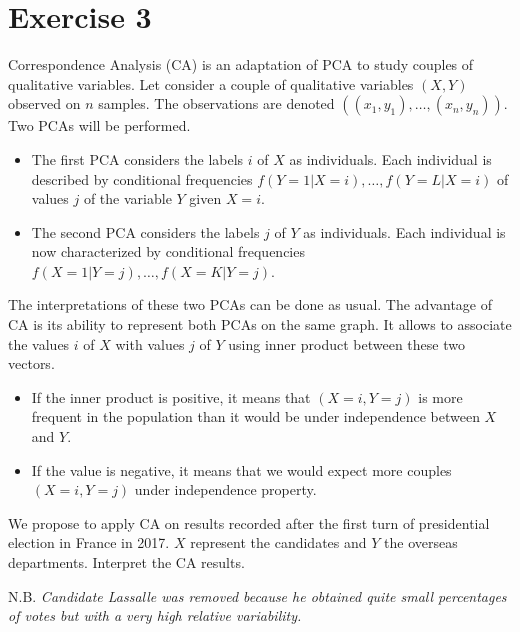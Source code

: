 \documentclass[
  11pt,
  a4paper,
]{article}
\begin{document}
\hypertarget{exercise-3}{%
\section{Exercise 3}\label{exercise-3}}

Correspondence Analysis (CA) is an adaptation of PCA to study couples of
qualitative variables. Let consider a couple of qualitative variables
\((X,Y)\) observed on \(n\) samples. The observations are denoted
\(((x_1,y_1),\ldots,(x_n,y_n))\). Two PCAs will be performed.

\begin{itemize}
\item
The first PCA considers the labels $i$ of $X$ as individuals. 
Each individual is described by  conditional frequencies
$f(Y=1 | X=i),\ldots,f(Y=L | X=i)$ of values $j$ of the variable $Y$ given 
$X=i$. 
\item
The second PCA considers the labels $j$ of $Y$ as individuals. 
Each individual is now  characterized by conditional frequencies 
$f(X=1 | Y=j),\ldots,f(X=K | Y=j)$. 
\end{itemize}

The interpretations of these two PCAs can be done as usual. The
advantage of CA is its ability to represent both PCAs on the same graph.
It allows to associate the values \(i\) of \(X\) with values \(j\) of
\(Y\) using inner product between these two vectors.

\begin{itemize}
\item
If the inner product is positive, it means that  $(X=i, Y=j)$ is more frequent in 
the population than it would be under independence between $X$ and $Y$. 
\item
If the value is negative, it means that we would expect more couples $(X=i, Y=j)$ 
under independence property.
\end{itemize}

We propose to apply CA on results recorded after the first turn of
presidential election in France in 2017. \(X\) represent the candidates
and \(Y\) the overseas departments. Interpret the CA results.

N.B.
\textit{Candidate Lassalle was removed because he obtained quite small percentages of votes 
but with a very high relative variability.}
\end{document}
